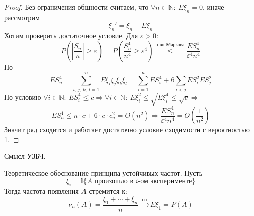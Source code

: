 \begin{proof}
  Без ограничения общности считаем, что $\forall n \in \mathbb{N}:\: E\xi_n = 0$, иначе рассмотрим
  \[\xi_n' = \xi_n - E\xi_n\]
  Хотим проверить достаточное условие. Для $\varepsilon > 0$:
  \[P\left(\left|\frac{S_n}{n}\right| \geq \varepsilon\right) = P\left(\frac{S_n^4}{n^4} \geq \varepsilon ^4\right) \stackrel{\text{н-во Маркова}}{\leq} \frac{ES_n^4}{\varepsilon^4n^4}\]
  Но 
  \[ES_n^4 = \sum_{i,\,j,\,k,\,l = 1}^n E\xi_i\xi_j\xi_k\xi_l = \sum_{i = 1}^n ES_i^4 + 6\sum_{i < j}ES_i^2ES_j^2\]
  По условию $\forall i \in \mathbb{N}:\: ES_i^4 \leq c \Rightarrow \forall i \in \mathbb{N}:\: E\xi_i^2 \leq \sqrt{E\xi_i^4} \leq \sqrt{c} \Rightarrow$
  \[ES_n^4 \leq n\cdot c + 6\cdot c\cdot c_n^2 = O(n^2) \Rightarrow \frac{ES_n^4}{\varepsilon^4n^4} = O\left(\frac{1}{n^2}\right)\]
  Значит ряд сходится и работает достаточно условие сходимости с вероятностью 1.
\end{proof}

\begin{note}
  Смысл УЗБЧ.

  Теоретическое обоснование принципа устойчивых частот. Пусть 
  \[\xi_i = \mathbb{I}\{A \text{ произошло в }i \text{-ом эксперименте}\}\]
  Тогда частота появления $A$ стремится к:
  \[\nu_n(A) = \frac{\xi_1 + \cdots + \xi_n}{n} \stackrel{\text{п.н.}}{\to} E\xi_1 = P(A)\]
\end{note}
